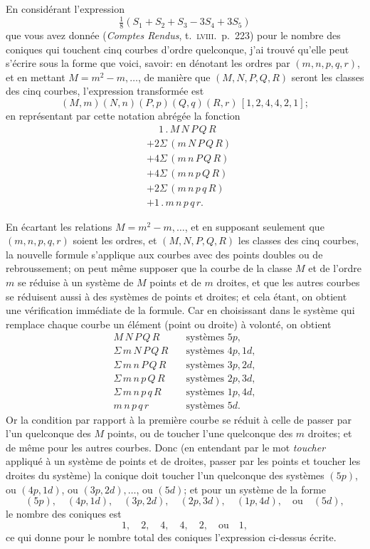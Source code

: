 \documentclass[11pt,a4paper]{article}
\begin{document}
\bigskip

En consid\'{e}rant l'expression
\[
\tfrac{1}{8}(S_1+S_2+S_3-3S_4+3S_5)
\]
que vous avez donn\'{e}e (\textit{Comptes Rendus}, t.\ \textsc{lviii}.\ p.\ 223) pour le nombre des coniques qui touchent cinq courbes d'ordre quelconque, j'ai trouv\'{e} qu'elle peut s'\'{e}crire sous la forme que voici, savoir: en d\'{e}notant les ordres par $(m,n,p,q,r)$, et en mettant $M=m^2-m,\ldots$, de mani\`{e}re que $(M,N,P,Q,R)$ seront les classes des cinq courbes, l'expression transform\'{e}e est
\[
(M,m)(N,n)(P,p)(Q,q)(R,r)\,[1,2,4,4,2,1];
\]
en repr\'{e}sentant par cette notation abr\'{e}g\'{e}e la fonction
\begin{align*}
&\phantom{+}1\,.\,M\,N\,P\,Q\,R\\
&+2\Sigma\,(m\,N\,P\,Q\,R)\\
&+4\Sigma\,(m\,n\,P\,Q\,R)\\
&+4\Sigma\,(m\,n\,p\,Q\,R)\\
&+2\Sigma\,(m\,n\,p\,q\,R)\\
&+1\,.\,m\,n\,p\,q\,r.
\end{align*}

En \'{e}cartant les relations $M=m^2-m,\ldots$, et en supposant seulement que $(m,n,p,q,r)$ soient les ordres, et $(M,N,P,Q,R)$ les classes des cinq courbes, la nouvelle formule s'applique aux courbes avec des points doubles ou de rebroussement; on peut m\^{e}me supposer que la courbe de la classe $M$ et de l'ordre $m$ se r\'{e}duise \`{a} un syst\`{e}me de $M$ points et de $m$ droites, et que les autres courbes se r\'{e}duisent aussi \`{a} des syst\`{e}mes de points et droites; et cela \'{e}tant, on obtient une v\'{e}rification imm\'{e}diate de la formule. Car en choisissant dans le syst\`{e}me qui remplace chaque courbe un \'{e}l\'{e}ment (point ou droite) \`{a} volont\'{e}, on obtient
\begin{align*}
M\,N\,P\,Q\,R & \quad\text{syst\`{e}mes } 5p,\\
\Sigma\,m\,N\,P\,Q\,R & \quad\text{syst\`{e}mes } 4p,1d,\\
\Sigma\,m\,n\,P\,Q\,R & \quad\text{syst\`{e}mes } 3p,2d,\\
\Sigma\,m\,n\,p\,Q\,R & \quad\text{syst\`{e}mes } 2p,3d,\\
\Sigma\,m\,n\,p\,q\,R & \quad\text{syst\`{e}mes } 1p,4d,\\
m\,n\,p\,q\,r & \quad\text{syst\`{e}mes } 5d.
\end{align*}
Or la condition par rapport \`{a} la premi\`{e}re courbe se r\'{e}duit \`{a} celle de passer par l'un quelconque des $M$ points, ou de toucher l'une quelconque des $m$ droites; et de m\^{e}me pour les autres courbes. Donc (en entendant par le mot \emph{toucher} appliqu\'{e} \`{a} un syst\`{e}me de points et de droites, passer par les points et toucher les droites du syst\`{e}me) la conique doit toucher l'un quelconque des syst\`{e}mes $(5p)$, ou $(4p,1d)$, ou $(3p,2d),\ldots$, ou $(5d)$; et pour un syst\`{e}me de la forme
\[
(5p),\quad (4p,1d),\quad (3p,2d),\quad (2p,3d),\quad (1p,4d),\quad \text{ou}\quad (5d),
\]
le nombre des coniques est
\[
1,\quad 2,\quad 4,\quad 4,\quad 2,\quad \text{ou}\quad 1,
\]
ce qui donne pour le nombre total des coniques l'expression ci-dessus \'{e}crite.
\end{document}
